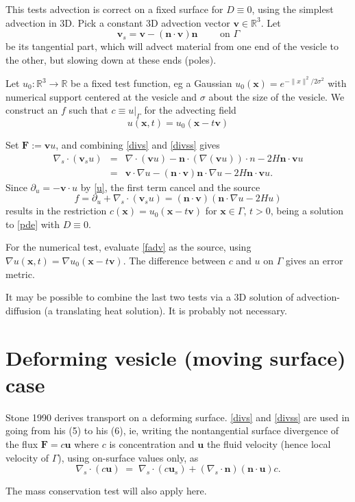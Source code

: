 \documentclass[11pt]{article}
\newcommand{\be}{\begin{equation}}
\newcommand{\ee}{\end{equation}}
\newcommand{\bea}{\begin{eqnarray}}
\newcommand{\eea}{\end{eqnarray}}
\newcommand{\mbf}[1]{{\mathbf #1}}
\newcommand{\R}{\mathbb{R}}
\newcommand{\x}{\mbf{x}}
\newcommand{\n}{\mbf{n}}
\newcommand{\uu}{\mbf{u}}
\newcommand{\vv}{\mbf{v}}
\begin{document}
This tests advection is correct on a fixed surface for $D\equiv 0$,
using the simplest advection in 3D.
Pick a constant 3D advection vector $\vv\in\R^3$.
Let
$$
\vv_s = \vv - (\n\cdot\vv)\n  \qquad \mbox{ on } \Gamma
$$
be its tangential part, which will advect material
from one end of the vesicle to the other, but slowing down at these ends (poles).

Let $u_0:\R^3\to\R$ be a fixed test function, eg a Gaussian
$u_0(\x) = e^{-\|x\|^2/2\sigma^2}$ with numerical support centered at the vesicle
and $\sigma$ about the size of the vesicle.
We construct an $f$ such that $c \equiv u|_\Gamma$ for the advecting
field
\be
u(\x,t) = u_0(\x - t\vv)
\label{u}
\ee

Set $\mbf{F} := \vv u$, and combining \eqref{divs} and \eqref{divss}
gives
\bea
\nabla_s\cdot(\vv_s u) &=& \nabla\cdot (\vv u) - \n\cdot (\nabla(\vv u)) \cdot n
- 2H \n \cdot\vv u
\nonumber\\
&=& \vv \cdot \nabla u - (\n\cdot\vv) \n\cdot \nabla u - 2H \n \cdot \vv u.
\eea
Since $\partial_u = -\vv\cdot u$ by \eqref{u}, the first term cancel
and the source
\be
f = \partial_u + \nabla_s\cdot(\vv_s u) = (\n\cdot\vv)(\n\cdot \nabla u - 2H u)
\label{fadv}
\ee
results in the restriction
$c(\x) = u_0(\x-t\vv)$ for $\x\in\Gamma$, $t>0$, being a
solution to \eqref{pde} with $D\equiv 0$.

For the numerical test,
evaluate \eqref{fadv} as the source, using
$\nabla u(\x,t) = \nabla u_0(\x-t\vv)$.
The difference between $c$ and $u$ on $\Gamma$ gives an error metric.

It may be possible to combine the last two tests via
a 3D solution of advection-diffusion (a translating heat solution).
It is probably not necessary.


\section{Deforming vesicle (moving surface) case}

Stone 1990 derives transport on a deforming surface.
\eqref{divs} and \eqref{divss} are used in going from his (5) to his (6),
ie, writing the nontangential surface divergence
of the flux $\mbf{F} = c\uu$ where $c$ is concentration and $\uu$ the
fluid velocity (hence local
velocity of $\Gamma$),
using on-surface values only, as
$$\nabla_s \cdot (c\uu) \;=\;
\nabla_s\cdot (c\uu_s) + (\nabla_s\cdot\n)
(\n\cdot\uu) c.$$

The mass conservation test will also apply here.
\end{document}
